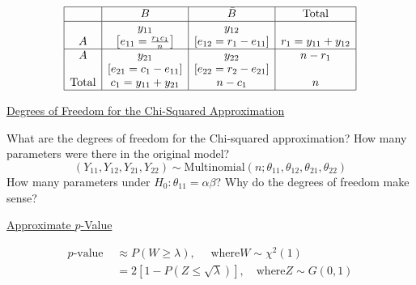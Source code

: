 \[ \begin{array}{|c|c|c|c|}
        \hline       & B                                           & \bar{B}                            & \text{Total}        \\
        \hline
                     & y_{11}                                      & y_{12}                             &                     \\
        A            & {\left[e_{11}=\frac{r_{1} c_{1}}{n}\right]} & {\left[e_{12}=r_{1}-e_{11}\right]} & r_{1}=y_{11}+y_{12} \\
        \hline A     & y_{21}                                      & y_{22}                             & n-r_{1}             \\
                     & {\left[e_{21}=c_{1}-e_{11}\right]}          & {\left[e_{22}=r_{2}-e_{21}\right]} &                     \\
        \text{Total} & c_{1}=y_{11}+y_{21}                         & n-c_{1}                            & n                   \\
        \hline
    \end{array} \]

\underline{Degrees of Freedom for the Chi-Squared Approximation}

What are the degrees of freedom for the Chi-squared approximation?
How many parameters were there in the original model?
\[
    \left(Y_{11}, Y_{12}, Y_{21}, Y_{22}\right) \sim \text{Multinomial}\left(n ; \theta_{11}, \theta_{12}, \theta_{21}, \theta_{22}\right)
\]
How many parameters under $H_{0}: \theta_{11}=\alpha \beta $?
Why do the degrees of freedom make sense?

\underline{Approximate $ p $-Value}

\[ \begin{aligned}
        p \text{-value } & \approx P(W \geq \lambda), \quad \text{ where} W \sim \chi^{2}(1) \\
                         & =2[1-P(Z \leq \sqrt{\lambda})], \quad \text{where} Z \sim G(0,1)
    \end{aligned} \]

